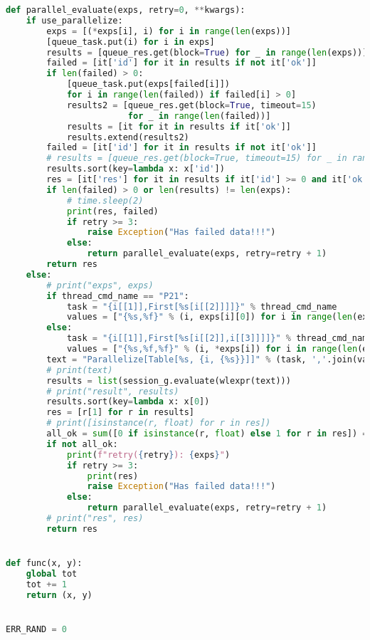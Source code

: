 \begin{lstlisting}[language=Python,breaklines=true]
def parallel_evaluate(exps, retry=0, **kwargs):
    if use_parallelize:
        exps = [(*exps[i], i) for i in range(len(exps))]
        [queue_task.put(i) for i in exps]
        results = [queue_res.get(block=True) for _ in range(len(exps))]
        failed = [it['id'] for it in results if not it['ok']]
        if len(failed) > 0:
            [queue_task.put(exps[failed[i]])
            for i in range(len(failed)) if failed[i] > 0]
            results2 = [queue_res.get(block=True, timeout=15)
                        for _ in range(len(failed))]
            results = [it for it in results if it['ok']]
            results.extend(results2)
        failed = [it['id'] for it in results if not it['ok']]
        # results = [queue_res.get(block=True, timeout=15) for _ in range(len(exps))]
        results.sort(key=lambda x: x['id'])
        res = [it['res'] for it in results if it['id'] >= 0 and it['ok']]
        if len(failed) > 0 or len(results) != len(exps):
            # time.sleep(2)
            print(res, failed)
            if retry >= 3:
                raise Exception("Has failed data!!!")
            else:
                return parallel_evaluate(exps, retry=retry + 1)
        return res
    else:
        # print("exps", exps)
        if thread_cmd_name == "P21":
            task = "{i[[1]],First[%s[i[[2]]]]}" % thread_cmd_name
            values = ["{%s,%f}" % (i, exps[i][0]) for i in range(len(exps))]
        else:
            task = "{i[[1]],First[%s[i[[2]],i[[3]]]]}" % thread_cmd_name
            values = ["{%s,%f,%f}" % (i, *exps[i]) for i in range(len(exps))]
        text = "Parallelize[Table[%s, {i, {%s}}]]" % (task, ','.join(values))
        # print(text)
        results = list(session_g.evaluate(wlexpr(text)))
        # print("result", results)
        results.sort(key=lambda x: x[0])
        res = [r[1] for r in results]
        # print([isinstance(r, float) for r in res])
        all_ok = sum([0 if isinstance(r, float) else 1 for r in res]) == 0
        if not all_ok:
            print(f"retry({retry}): {exps}")
            if retry >= 3:
                print(res)
                raise Exception("Has failed data!!!")
            else:
                return parallel_evaluate(exps, retry=retry + 1)
        # print("res", res)
        return res


def func(x, y):
    global tot
    tot += 1
    return (x, y)


ERR_RAND = 0


\end{lstlisting}

